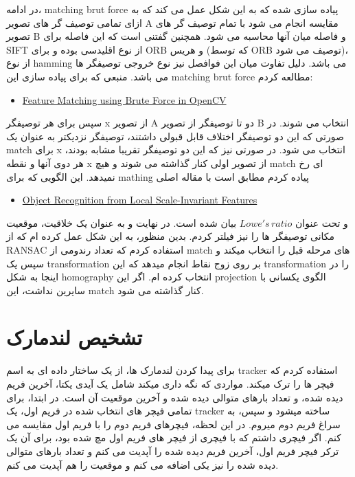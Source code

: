 \documentclass[a4paper,12pt]{article}
\begin{document}
در ادامه، matching brut force پیاده سازی شده که به این شکل عمل می کند که به ازای تمامی توصیف گر های تصویر A مقایسه انجام می شود با تمام توصیف گر های تصویر B و فاصله میان آنها محاسبه می شود. همچنین گفتنی است که این فاصله برای SIFT از نوع اقلیدسی بوده و برای ORB و هریس (که توسط ORB توصیف می شود)، از نوع hamming می باشد. دلیل تفاوت میان این فوافصل نیز نوع خروجی توصیفگر ها می باشد. 
منبعی که برای پیاده سازی این matching brut force مطالعه کردم:
\begin{latin}
	\begin{itemize}
		\item \href{https://www.geeksforgeeks.org/machine-learning/feature-matching-using-brute-force-in-opencv/}{Feature Matching using Brute Force in OpenCV}
	\end{itemize}
\end{latin}

سپس برای هر توصیفگر x از تصویر A دو تا توصیفگر از تصویر B انتخاب می شوند. در صورتی که این دو توصیفگر اختلاف قابل قبولی داشتند، توصیفگر نزدیکتر به عنوان یک match برای x انتخاب می شود. در صورتی نیز که این دو توصیفگر تقریبا مشابه بودند، هر دوی آنها و نقطه x از تصویر اولی کنار گذاشته می شوند و هیچ match ای رخ نمیدهد. این الگویی که برای mathing پیاده کردم مطابق است با مقاله اصلی 
\begin{latin}
	\begin{itemize}
		\item \href{https://www.cs.ubc.ca/~lowe/papers/iccv99.pdf}{Object Recognition from Local Scale-Invariant Features}
	\end{itemize}
\end{latin}
و تحت عنوان 
$ Lowe's \, ratio$ 
بیان شده است. در نهایت و به عنوان یک خلاقیت، موقعیت مکانی توصیفگر ها را نیز فیلتر کردم. بدین منظور، به این شکل عمل کرده ام که از
RANSAC 
استفاده کردم که تعداد رندومی از match های مرحله قبل را  انتخاب میکند و سپس یک transformation بر روی زوج نقاط انجام میدهد که این transformation را در اینجا به شکل homography انتخاب کرده ام. اگر این projection الگوی یکسانی با سایرین نداشت، این match کنار گذاشته می شود.

\section*{تشخیص لندمارک}

برای پیدا کردن لندمارک ها، از یک ساختار داده ای به اسم tracker استفاده کردم که فیچر ها را ترک میکند. مواردی که نگه داری میکند شامل یک آیدی یکتا، آخرین فریم دیده شده، و تعداد بارهای متوالی دیده شده و آخرین موقعیت آن است. 
در ابتدا، برای تمامی فیچر های انتخاب شده در فریم اول، یک tracker ساخته میشود و سپس، به سراغ فریم دوم میروم. در این لحظه، فیچرهای فریم دوم را با فریم اول مقایسه می کنم. اگر فیچری داشتم که با فیچری از فیچر های فریم اول مچ شده بود، برای آن یک ترکر فیچر فریم اول، آخرین فریم دیده شده را آپدیت می کنم و تعداد بارهای متوالی دیده شده را نیز یکی اضافه می کنم و موقعیت را هم آپدیت می کنم.
\end{document}
